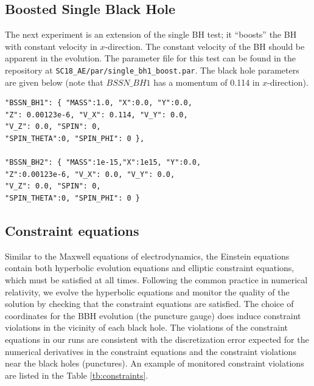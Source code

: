 \subsection{Boosted Single Black Hole}
\label{sec:AE_sbhboost}

The next experiment is an extension of the single BH test;
it ``boosts'' the BH with constant velocity in $x$-direction.
The constant velocity of the BH should be apparent in the evolution. 
The parameter file for this test can be found in the repository at 
\texttt{SC18\_AE/par/single\_bh1\_boost.par}.
The black hole parameters are given below (note
that $BSSN\_BH1$ has a momentum of 0.114 in $x$-direction).

\begin{lstlisting}[basicstyle=\small]
"BSSN_BH1": { "MASS":1.0, "X":0.0, "Y":0.0, 
"Z": 0.00123e-6, "V_X": 0.114, "V_Y": 0.0, 
"V_Z": 0.0, "SPIN": 0, 
"SPIN_THETA":0, "SPIN_PHI": 0 },

"BSSN_BH2": { "MASS":1e-15,"X":1e15, "Y":0.0, 
"Z":0.00123e-6, "V_X": 0.0, "V_Y": 0.0, 
"V_Z": 0.0, "SPIN": 0, 
"SPIN_THETA":0, "SPIN_PHI": 0 }
\end{lstlisting}



\subsection{Constraint equations}

Similar to the Maxwell equations of electrodynamics, the Einstein equations
contain both hyperbolic evolution equations and elliptic constraint equations,
which must be satisfied at all times. Following the common practice in
numerical relativity, we evolve the hyperbolic equations and monitor the 
quality of the solution by checking that the constraint equations are 
satisfied. The choice of coordinates for the BBH evolution (the puncture gauge) 
does induce constraint violations in the vicinity of each black hole.
The violations of the constraint equations in our runs are consistent with 
the discretization error expected for the numerical derivatives in the
constraint equations and the constraint violations near the black holes 
(punctures). An example of monitored constraint violations are listed in the Table \ref{tb:constraints}.


